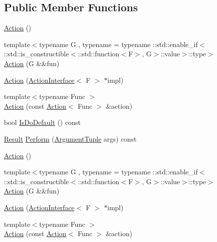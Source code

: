 \subsection*{Public Member Functions}
\begin{DoxyCompactItemize}
\item 
\mbox{\hyperlink{classtesting_1_1_action_a9e72d404d52a0c6d6edefac30f76e02d}{Action}} ()
\item 
{\footnotesize template$<$typename G , typename  = typename \+::std\+::enable\+\_\+if$<$                \+::std\+::is\+\_\+constructible$<$\+::std\+::function$<$\+F$>$, G$>$\+::value$>$\+::type$>$ }\\\mbox{\hyperlink{classtesting_1_1_action_a2f5924eb6c0113be8f226aa3630b2cc2}{Action}} (G \&\&fun)
\item 
\mbox{\hyperlink{classtesting_1_1_action_a5ce44c673e3f91378777b954d88917cd}{Action}} (\mbox{\hyperlink{classtesting_1_1_action_interface}{Action\+Interface}}$<$ F $>$ $\ast$impl)
\item 
{\footnotesize template$<$typename Func $>$ }\\\mbox{\hyperlink{classtesting_1_1_action_a806bacddaa1f1daf61f89674564bdf0f}{Action}} (const \mbox{\hyperlink{classtesting_1_1_action}{Action}}$<$ Func $>$ \&action)
\item 
bool \mbox{\hyperlink{classtesting_1_1_action_a4468ca2ea5e9f7363271145992d09dba}{Is\+Do\+Default}} () const
\item 
\mbox{\hyperlink{classtesting_1_1_action_a9af08a21ad329331fde856cba9b6dea2}{Result}} \mbox{\hyperlink{classtesting_1_1_action_a5489a68def1d82eb61df819eae52dc8f}{Perform}} (\mbox{\hyperlink{classtesting_1_1_action_ae27fda510696a9294f991de5b1abfaf2}{Argument\+Tuple}} args) const
\item 
\mbox{\hyperlink{classtesting_1_1_action_a967772922a39dd7098bee429d749f277}{Action}} ()
\item 
{\footnotesize template$<$typename G , typename  = typename \+::std\+::enable\+\_\+if$<$                \+::std\+::is\+\_\+constructible$<$\+::std\+::function$<$\+F$>$, G$>$\+::value$>$\+::type$>$ }\\\mbox{\hyperlink{classtesting_1_1_action_a2f5924eb6c0113be8f226aa3630b2cc2}{Action}} (G \&\&fun)
\item 
\mbox{\hyperlink{classtesting_1_1_action_a5ce44c673e3f91378777b954d88917cd}{Action}} (\mbox{\hyperlink{classtesting_1_1_action_interface}{Action\+Interface}}$<$ F $>$ $\ast$impl)
\item 
{\footnotesize template$<$typename Func $>$ }\\\mbox{\hyperlink{classtesting_1_1_action_a806bacddaa1f1daf61f89674564bdf0f}{Action}} (const \mbox{\hyperlink{classtesting_1_1_action}{Action}}$<$ Func $>$ \&action)

\end{DoxyCompactItemize}
